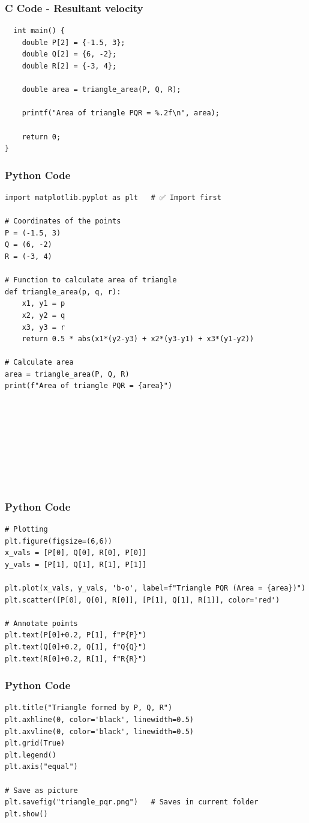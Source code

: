 \documentclass{beamer}
\begin{document}
\begin{frame}[fragile]
    \frametitle{C Code - Resultant velocity}

    \begin{lstlisting}
  int main() {
    double P[2] = {-1.5, 3};
    double Q[2] = {6, -2};
    double R[2] = {-3, 4};

    double area = triangle_area(P, Q, R);
    
    printf("Area of triangle PQR = %.2f\n", area);
    
    return 0;
}

    \end{lstlisting}
\end{frame}
\begin{frame}[fragile]
    \frametitle{Python Code}
    \begin{lstlisting}
import matplotlib.pyplot as plt   # ✅ Import first

# Coordinates of the points
P = (-1.5, 3)
Q = (6, -2)
R = (-3, 4)

# Function to calculate area of triangle
def triangle_area(p, q, r):
    x1, y1 = p
    x2, y2 = q
    x3, y3 = r
    return 0.5 * abs(x1*(y2-y3) + x2*(y3-y1) + x3*(y1-y2))

# Calculate area
area = triangle_area(P, Q, R)
print(f"Area of triangle PQR = {area}")









    \end{lstlisting}
\end{frame}

\begin{frame}[fragile]
    \frametitle{Python Code}
    \begin{lstlisting}
# Plotting
plt.figure(figsize=(6,6))
x_vals = [P[0], Q[0], R[0], P[0]]
y_vals = [P[1], Q[1], R[1], P[1]]

plt.plot(x_vals, y_vals, 'b-o', label=f"Triangle PQR (Area = {area})")
plt.scatter([P[0], Q[0], R[0]], [P[1], Q[1], R[1]], color='red')

# Annotate points
plt.text(P[0]+0.2, P[1], f"P{P}")
plt.text(Q[0]+0.2, Q[1], f"Q{Q}")
plt.text(R[0]+0.2, R[1], f"R{R}")

    \end{lstlisting}
\end{frame}

\begin{frame}[fragile]
    \frametitle{Python Code}
    \begin{lstlisting}
plt.title("Triangle formed by P, Q, R")
plt.axhline(0, color='black', linewidth=0.5)
plt.axvline(0, color='black', linewidth=0.5)
plt.grid(True)
plt.legend()
plt.axis("equal")

# Save as picture
plt.savefig("triangle_pqr.png")   # Saves in current folder
plt.show()

    \end{lstlisting}
\end{frame}
\end{document}
